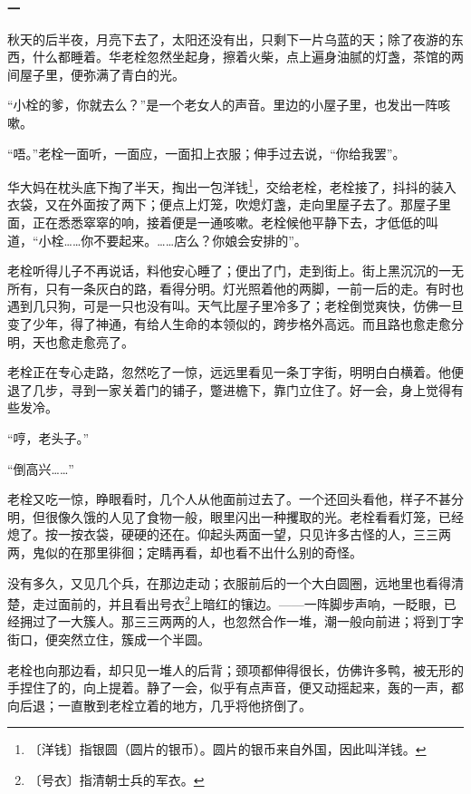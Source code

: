 \documentclass[12pt,UTF-8,openany]{ctexbook}
\begin{document}
\begin{large}
    
    \begin{center}\textbf{一}\end{center}
    
    秋天的后半夜，月亮下去了，太阳还没有出，只剩下一片乌蓝的天；除了夜游的东西，什么都睡着。华老栓忽然坐起身，擦着火柴，点上遍身油腻的灯盏，茶馆的两间屋子里，便弥满了青白的光。
    
    “小栓的爹，你就去么？”是一个老女人的声音。里边的小屋子里，也发出一阵咳嗽。
    
    “唔。”老栓一面听，一面应，一面扣上衣服；伸手过去说，“你给我罢”。
    
    华大妈在枕头底下掏了半天，掏出一包洋钱\footnote{〔洋钱〕指银圆（圆片的银币）。圆片的银币来自外国，因此叫洋钱。}，交给老栓，老栓接了，抖抖的装入衣袋，又在外面按了两下；便点上灯笼，吹熄灯盏，走向里屋子去了。那屋子里面，正在悉悉窣窣的响，接着便是一通咳嗽。老栓候他平静下去，才低低的叫道，“小栓……你不要起来。……店么？你娘会安排的”。
    
    老栓听得儿子不再说话，料他安心睡了；便出了门，走到街上。街上黑沉沉的一无所有，只有一条灰白的路，看得分明。灯光照着他的两脚，一前一后的走。有时也遇到几只狗，可是一只也没有叫。天气比屋子里冷多了；老栓倒觉爽快，仿佛一旦变了少年，得了神通，有给人生命的本领似的，跨步格外高远。而且路也愈走愈分明，天也愈走愈亮了。
    
    老栓正在专心走路，忽然吃了一惊，远远里看见一条丁字街，明明白白横着。他便退了几步，寻到一家关着门的铺子，蹩进檐下，靠门立住了。好一会，身上觉得有些发冷。
    
    “哼，老头子。”
    
    “倒高兴……”
    
    老栓又吃一惊，睁眼看时，几个人从他面前过去了。一个还回头看他，样子不甚分明，但很像久饿的人见了食物一般，眼里闪出一种攫取的光。老栓看看灯笼，已经熄了。按一按衣袋，硬硬的还在。仰起头两面一望，只见许多古怪的人，三三两两，鬼似的在那里徘徊；定睛再看，却也看不出什么别的奇怪。
    
    没有多久，又见几个兵，在那边走动；衣服前后的一个大白圆圈，远地里也看得清楚，走过面前的，并且看出号衣\footnote{〔号衣〕指清朝士兵的军衣。}上暗红的镶边。——一阵脚步声响，一眨眼，已经拥过了一大簇人。那三三两两的人，也忽然合作一堆，潮一般向前进；将到丁字街口，便突然立住，簇成一个半圆。
    
    老栓也向那边看，却只见一堆人的后背；颈项都伸得很长，仿佛许多鸭，被无形的手捏住了的，向上提着。静了一会，似乎有点声音，便又动摇起来，轰的一声，都向后退；一直散到老栓立着的地方，几乎将他挤倒了。
    

\end{large}
\end{document}
